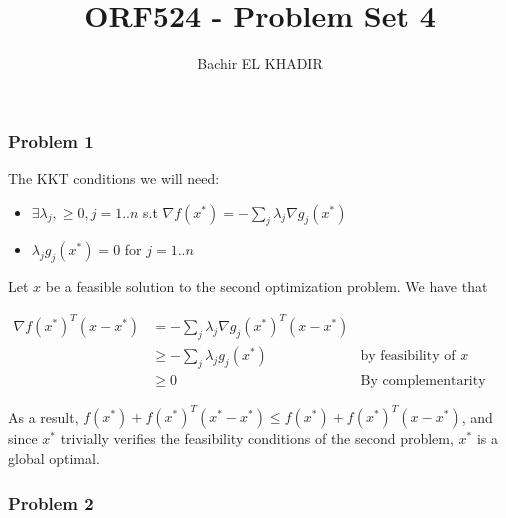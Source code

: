 \documentclass[12pt]{article}
\title{ORF524 - Problem Set 4}
\author{Bachir EL KHADIR }
\newcommand{\Q}[1]{\subsubsection*{Problem #1}}
\begin{document}
\maketitle

\Q{1}
The KKT conditions we will need:

\begin{itemize}
\item $\exists \lambda_j, \ge 0,  j= 1..n$ s.t $\nabla f(x^*) = - \sum_j \lambda_j \nabla g_j(x^*)$
\item $\lambda_j g_j(x^*) = 0$ for $j = 1..n$
\end{itemize}

Let $x$ be a feasible solution to the second optimization problem. We have that

\begin{align*}
\nabla f(x^*)^T(x-x^*) &= - \sum_j \lambda_j \nabla g_j(x^*)^T(x-x^*)
\\& \ge - \sum_j \lambda_j g_j(x^*) &\text{by feasibility of $x$}
\\& \ge 0 &\text{By complementarity condition}
\end{align*}

As a result, $f(x^*) + f(x^*)^T(x^*-x^*) \le f(x^*) + f(x^*)^T(x-x^*)$, and since $x^*$ trivially verifies the feasibility conditions of the second problem, $x^*$ is a global optimal.


\Q{2}
\end{document}
